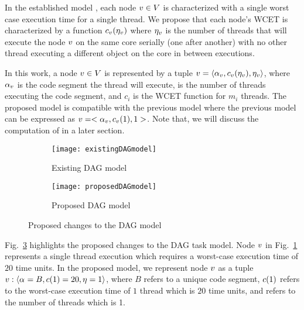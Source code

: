 In the established model \addcite, each node ${\node{1} \in \nodeset{}}$ is characterized
with a single worst case execution time for a single thread. We
propose that each node's WCET is characterized by a function
${\newwcet{\node{1}}{\noofthreads{\node{1}}}}$ where $\noofthreads{\node{1}}$ is the number of threads that will execute the
node ${\node{1}}$ on the same core serially (one after another) with no
other thread executing a different object on the core in between executions.

In this work, a node ${\node{1} \in \nodeset{}}$ is represented by a tuple ${\node{1} = \langle \cs{\node{1}}, \newwcet{\node{1}}{\noofthreads{\node{1}}}, \noofthreads{\node{1}} \rangle }$, where $\cs{\node{1}}$ is the code segment the thread will execute,  is the number of threads executing the code segment, and ${c_i}$ is the WCET function for ${m_i}$ threads. The proposed model is  compatible with the previous model \addcite where the previous model can be expressed as ${\node{1} = <\cs{\node{1}}, \newwcet{\node{1}}{1}, 1>}$. Note that, we will discuss the computation of  in a later section.

\begin{figure}
  \centering
  \begin{subfigure}[b]{0.4\textwidth}{
      \texttt{[image: existingDAGmodel]}
      \caption{Existing DAG model}
      \label{fig:existingDAGmodel}
    }
  \end{subfigure} \quad
  \begin{subfigure}[b]{0.4\textwidth}{
      \texttt{[image: proposedDAGmodel]}
      \caption{Proposed DAG model}
      \label{fig:proposedDAGmodel}
    }
  \end{subfigure}
  \caption{Proposed changes to the DAG model}
  \label{fig:dag-change}
\end{figure}


Fig.~\ref{fig:dag-change} highlights the proposed changes to the DAG task model.  Node $\node{1}$ in Fig.~\ref{fig:existingDAGmodel} represents a single thread execution which requires a worst-case execution time of $20$ time units. In the proposed model, we represent node $\node{1}$ as a tuple $\node{1} : \langle \cs{} = B, \newwcet{}{1} = 20,  \noofthreads{} = 1\rangle$, where $B$ refers to a unique code segment, $ \newwcet{}{1}$ refers to the worst-case execution time of $1$ thread which is $20$ time units, and \noofthreads{} refers to the number of threads which is 1.

